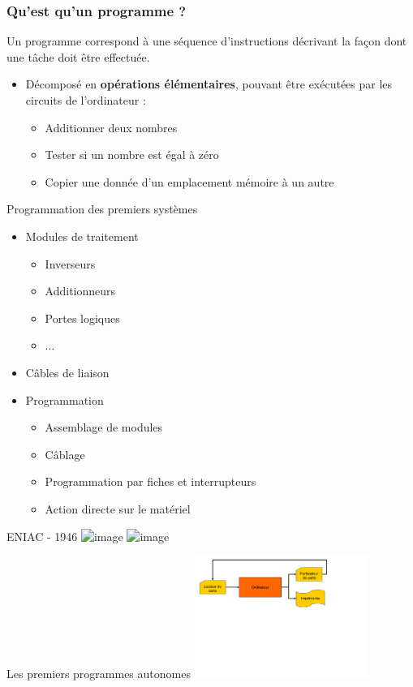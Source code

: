 \begin{frame}
\frametitle{Qu'est qu'un programme ?}
\begin{definition}
Un programme correspond à une séquence d'instructions décrivant la façon dont une tâche doit être effectuée. \cite{tanen}
\end{definition}
\begin{itemize}
\item Décomposé en \textbf{opérations élémentaires}, pouvant être exécutées par les circuits de l'ordinateur :
\begin{itemize}
\item Additionner deux nombres
\item Tester si un nombre est égal à zéro
\item Copier une donnée d'un emplacement mémoire à un autre
\end{itemize}
\end{itemize}
\end{frame}


\begin{frame}{Programmation des premiers systèmes}
\begin{itemize}
\item Modules de traitement
\begin{itemize}
\item Inverseurs
\item Additionneurs
\item Portes logiques
\item ...
\end{itemize}
\item Câbles de liaison
\item Programmation
\begin{itemize}
\item Assemblage de modules
\item Câblage
\item Programmation par fiches et interrupteurs
\item Action directe sur le matériel
\end{itemize}
\end{itemize}
\end{frame}

\begin{frame}{ENIAC - 1946}
\includegraphics<1>[height=5cm]{../illustration/eniac1.png}
\includegraphics<2>[height=5cm]{../illustration/eniac2.png}
\end{frame}


\begin{frame}{Les premiers programmes autonomes}
\includegraphics[height=4cm]{../illustration/pgm_autonome.pdf}
\end{frame}


